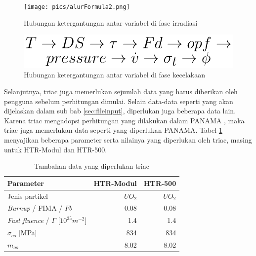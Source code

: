 \documentclass[a4paper,11pt]{report}
\newcommand{\ra}[1]{\renewcommand{\arraystretch}{#1}}
\begin{document}
\begin{figure}[h]
  \begin{center}
    \texttt{[image: pics/alurFormula2.png]}
    \caption{Hubungan ketergantungan antar variabel di fase irradiasi}
    \label{fig:irradiasi}
  \end{center}
\end{figure}

\begin{figure}[h]
  \begin{center}
    \includegraphics[scale=.5]{pics/alurFormula.png}
    \caption{Hubungan ketergantungan antar variabel di fase kecelakaan}
    \label{fig:accident}
  \end{center}
\end{figure}

Selanjutnya, triac juga memerlukan sejumlah data yang harus diberikan oleh pengguna sebelum perhitungan dimulai. Selain data-data seperti yang akan dijelaskan dalam sub bab \ref{sec:fileinput}, diperlukan juga beberapa data lain. Karena triac mengadopsi perhitungan yang dilakukan dalam PANAMA \cite{report1}, maka triac juga memerlukan data seperti yang diperlukan PANAMA. Tabel \ref{tab:additionalData} menyajikan beberapa parameter serta nilainya yang diperlukan oleh triac, masing untuk HTR-Modul dan HTR-500.

\begin{table}[h]
  \caption[Tambahan data yang diperlukan triac]{Tambahan data yang diperlukan triac\cite{report1}}
  \label{tab:additionalData}

  \begin{center}
  \ra{1.3}
    \begin{tabular}{@{}lrr@{}}\toprule
    Parameter & HTR-Modul & HTR-500 \\ \midrule%
       Jenis partikel & $UO_2$ & $UO_2$ \\ 
       \textit{Burnup} / FIMA / $Fb$ & 0.08 & 0.08 \\
       \textit{Fast fluence} / $\Gamma$ [$10^{25}m^{-2}$] & 1.4 & 1.4 \\
       $\sigma_{oo}$ [MPa] & 834 & 834 \\
       $m_{oo}$ & 8.02 & 8.02 \\
       \bottomrule
    \end{tabular}
  \end{center}
\end{table}
\end{document}
